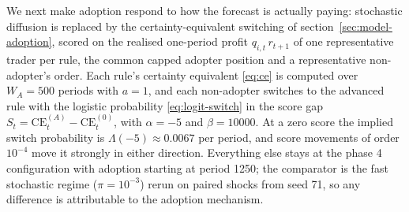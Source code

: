 \documentclass[12pt]{article}
\begin{document}
We next make adoption respond to how the forecast is actually paying: stochastic diffusion is replaced by the certainty-equivalent switching of section~\ref{sec:model-adoption}, scored on the realised one-period profit $q_{i,t}\, r_{t+1}$ of one representative trader per rule, the common capped adopter position and a representative non-adopter's order. %
Each rule's certainty equivalent \eqref{eq:ce} is computed over $W_A=500$ periods with $a=1$, and each non-adopter switches to the advanced rule with the logistic probability \eqref{eq:logit-switch} in the score gap $S_t=\mathrm{CE}^{(A)}_t-\mathrm{CE}^{(0)}_t$, with $\alpha=-5$ and $\beta=10000$. %
At a zero score the implied switch probability is $\Lambda(-5)\approx0.0067$ per period, and score movements of order $10^{-4}$ move it strongly in either direction. %
Everything else stays at the phase 4 configuration with adoption starting at period 1250; the comparator is the fast stochastic regime ($\pi=10^{-3}$) rerun on paired shocks from seed 71, so any difference is attributable to the adoption mechanism. %
\end{document}
